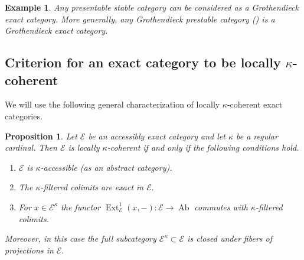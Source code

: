 \documentclass[11pt,leqno]{amsart}
\newtheorem{prop}[theo]{Proposition}
\newtheorem{example}[theo]{Example}
\numberwithin{equation}{section}
\newcommand{\cE}{{\mathcal E}}
\newcommand{\Ab}{\operatorname{Ab}}
\newcommand{\Ext}{\operatorname{Ext}}
\begin{document}
\begin{example}
Any presentable stable category can be considered as a Grothendieck exact category. More generally, any Grothendieck prestable category (\cite[Definition C.1.4.2]{Lur18})  is a Grothendieck exact category.
\end{example}

\subsection{Criterion for an exact category to be locally $\kappa$-coherent}

We will use the following general characterization of locally $\kappa$-coherent exact categories.

\begin{prop}\label{prop:criterion_locally_kappa_coherent}
	Let $\cE$ be an accessibly exact category and let $\kappa$ be a regular cardinal. Then $\cE$ is locally $\kappa$-coherent if and only if the following conditions hold.
	\begin{enumerate}[label=(\roman*),ref=(\roman*)]
		\item $\cE$ is $\kappa$-accessible (as an abstract category). \label{kappa_accessible}
		\item The $\kappa$-filtered colimits are exact in $\cE.$ \label{exactness_of_kappa_filtered}
		\item For $x\in\cE^{\kappa}$ the functor $\Ext^1_{\cE}(x,-):\cE\to\Ab$ commutes with $\kappa$-filtered colimits. \label{Ext^1_kappa_continuous_again}
	\end{enumerate}
	
	Moreover, in this case the full subcategory $\cE^{\kappa}\subset \cE$ is closed under fibers of projections in $\cE.$
\end{prop}
\end{document}

